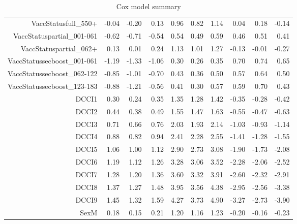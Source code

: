 \begin{table}[ht]
\begin{tabular}{rrrrrrrrrr}
  VaccStatusfull\_550+ & -0.04 & -0.20 & 0.13 & 0.96 & 0.82 & 1.14 & 0.04 & 0.18 & -0.14 \\ 
  VaccStatuspartial\_001-061 & -0.62 & -0.71 & -0.54 & 0.54 & 0.49 & 0.59 & 0.46 & 0.51 & 0.41 \\ 
  VaccStatuspartial\_062+ & 0.13 & 0.01 & 0.24 & 1.13 & 1.01 & 1.27 & -0.13 & -0.01 & -0.27 \\ 
  VaccStatussecboost\_001-061 & -1.19 & -1.33 & -1.06 & 0.30 & 0.26 & 0.35 & 0.70 & 0.74 & 0.65 \\ 
  VaccStatussecboost\_062-122 & -0.85 & -1.01 & -0.70 & 0.43 & 0.36 & 0.50 & 0.57 & 0.64 & 0.50 \\ 
  VaccStatussecboost\_123-183 & -0.88 & -1.21 & -0.56 & 0.41 & 0.30 & 0.57 & 0.59 & 0.70 & 0.43 \\ 
  DCCI1 & 0.30 & 0.24 & 0.35 & 1.35 & 1.28 & 1.42 & -0.35 & -0.28 & -0.42 \\ 
  DCCI2 & 0.44 & 0.38 & 0.49 & 1.55 & 1.47 & 1.63 & -0.55 & -0.47 & -0.63 \\ 
  DCCI3 & 0.71 & 0.66 & 0.76 & 2.03 & 1.93 & 2.14 & -1.03 & -0.93 & -1.14 \\ 
  DCCI4 & 0.88 & 0.82 & 0.94 & 2.41 & 2.28 & 2.55 & -1.41 & -1.28 & -1.55 \\ 
  DCCI5 & 1.06 & 1.00 & 1.12 & 2.90 & 2.73 & 3.08 & -1.90 & -1.73 & -2.08 \\ 
  DCCI6 & 1.19 & 1.12 & 1.26 & 3.28 & 3.06 & 3.52 & -2.28 & -2.06 & -2.52 \\ 
  DCCI7 & 1.28 & 1.20 & 1.36 & 3.60 & 3.32 & 3.91 & -2.60 & -2.32 & -2.91 \\ 
  DCCI8 & 1.37 & 1.27 & 1.48 & 3.95 & 3.56 & 4.38 & -2.95 & -2.56 & -3.38 \\ 
  DCCI9 & 1.45 & 1.32 & 1.59 & 4.27 & 3.73 & 4.90 & -3.27 & -2.73 & -3.90 \\ 
  SexM & 0.18 & 0.15 & 0.21 & 1.20 & 1.16 & 1.23 & -0.20 & -0.16 & -0.23 \\ 
   \hline
\end{tabular}
\caption{Cox model summary} 
\end{table}
